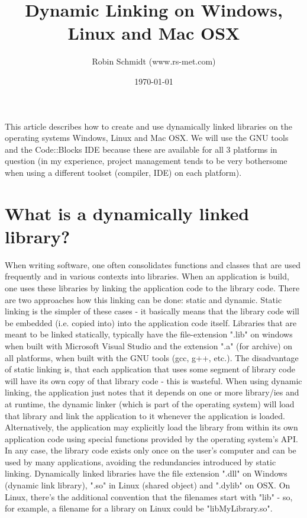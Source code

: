 \title{Dynamic Linking on Windows, Linux and Mac OSX}
\author{Robin Schmidt (www.rs-met.com)}
\date{\today}
\maketitle

This article describes how to create and use dynamically linked libraries on the operating systems Windows, Linux and Mac OSX. We will use the GNU tools and the Code::Blocks IDE because these are available for all 3 platforms in question (in my experience, project management tends to be very bothersome when using a different toolset (compiler, IDE) on each platform).

\section{What is a dynamically linked library?}
When writing software, one often consolidates functions and classes that are used frequently and in various contexts into libraries. When an application is build, one uses these libraries by linking the application code to the library code. There are two approaches how this linking can be done: static and dynamic. Static linking is the simpler of these cases - it basically means that the library code will be embedded (i.e. copied into) into the application code itself. Libraries that are meant to be linked statically, typically have the file-extension ".lib" on windows when built with Microsoft Visual Studio and the extension ".a" (for archive) on all platforms, when built with the GNU tools (gcc, g++, etc.). The disadvantage of static linking is, that each application that uses some segment of library code will have its own copy of that library code - this is wasteful. When using dynamic linking, the application just notes that it depends on one or more library/ies and at runtime, the dynamic linker (which is part of the operating system) will load that library and link the application to it whenever the application is loaded. Alternatively, the application may explicitly load the library from within its own application code using special functions provided by the operating system's API. In any case, the library code exists only once on the user's computer and can be used by many applications, avoiding the redundancies introduced by static linking. Dynamically linked libraries have the file extension ".dll" on Windows (dynamic link library), ".so" in Linux (shared object) and ".dylib" on OSX. On Linux, there's the additional convention that the filenames start with "lib" - so, for example, a filename for a library on Linux could be "libMyLibrary.so".


